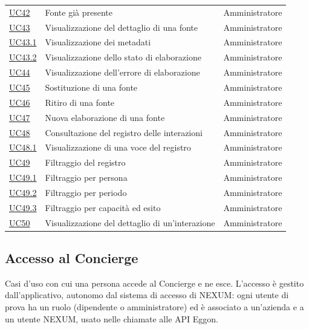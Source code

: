 \documentclass[documento]{gpt}
\begin{document}
{\begin{longtable}{@{}p{1.9cm}>{\raggedright\arraybackslash}p{8.7cm}>{\raggedright\arraybackslash}p{4.2cm}@{}}
\hyperref[uc:fn_dup]{UC42} & Fonte già presente & Amministratore \\
\hyperref[uc:fn_dettaglio]{UC43} & Visualizzazione del dettaglio di una fonte & Amministratore \\
\hspace{1em}\hyperref[uc:fn_meta_v]{UC43.1} & Visualizzazione dei metadati & Amministratore \\
\hspace{1em}\hyperref[uc:fn_stato]{UC43.2} & Visualizzazione dello stato di elaborazione & Amministratore \\
\hyperref[uc:fn_errore]{UC44} & Visualizzazione dell'errore di elaborazione & Amministratore \\
\hyperref[uc:fn_sostituisci]{UC45} & Sostituzione di una fonte & Amministratore \\
\hyperref[uc:fn_ritira]{UC46} & Ritiro di una fonte & Amministratore \\
\hyperref[uc:fn_riprova]{UC47} & Nuova elaborazione di una fonte & Amministratore \\
\hyperref[uc:tr_elenco]{UC48} & Consultazione del registro delle interazioni & Amministratore \\
\hspace{1em}\hyperref[uc:tr_voce]{UC48.1} & Visualizzazione di una voce del registro & Amministratore \\
\hyperref[uc:tr_filtro]{UC49} & Filtraggio del registro & Amministratore \\
\hspace{1em}\hyperref[uc:tr_f_persona]{UC49.1} & Filtraggio per persona & Amministratore \\
\hspace{1em}\hyperref[uc:tr_f_periodo]{UC49.2} & Filtraggio per periodo & Amministratore \\
\hspace{1em}\hyperref[uc:tr_f_capacita]{UC49.3} & Filtraggio per capacità ed esito & Amministratore \\
\hyperref[uc:tr_dettaglio]{UC50} & Visualizzazione del dettaglio di un'interazione & Amministratore \\
\end{longtable}}

\subsection{Accesso al Concierge}\label{area:accesso}
Casi d'uso con cui una persona accede al Concierge e ne esce. L'accesso è gestito dall'applicativo, autonomo dal sistema di accesso di NEXUM: ogni utente di prova ha un ruolo (dipendente o amministratore) ed è associato a un'azienda e a un utente NEXUM, usato nelle chiamate alle API Eggon.
\end{document}

